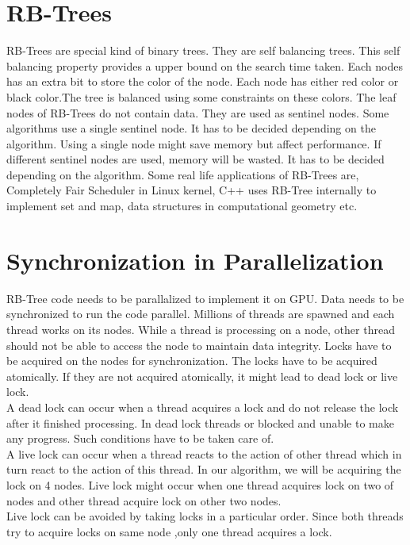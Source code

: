 \documentclass[BTech]{iitmdiss}
\begin{document}
\section{RB-Trees}
RB-Trees are special kind of binary trees. They are self balancing trees. This self balancing property provides a upper bound on the search time taken. Each nodes has an extra bit to store the color of the node. Each node has either red color or black color.The tree is balanced using some constraints on these colors. The leaf nodes of RB-Trees do not contain data. They are used as sentinel nodes. Some algorithms use a single sentinel node. It has to be decided depending on the algorithm. Using a single node might save memory but affect performance. If different sentinel nodes are used, memory will be wasted. It has to be decided depending on the algorithm. Some real life applications of RB-Trees are, Completely Fair Scheduler in Linux kernel, C++ uses RB-Tree internally to implement set and map, data structures in computational geometry etc. \\
\section{Synchronization in Parallelization}
RB-Tree code needs to be parallalized to implement it on GPU. Data needs to be synchronized to run the code parallel. Millions of threads are spawned and each thread works on its nodes. While a thread is processing on a node, other thread should not be able to access the node to maintain data integrity. Locks have to be acquired on the nodes for synchronization. The locks have to be acquired atomically. If they are not acquired atomically, it might lead to dead lock or live lock.\\
A dead lock can occur when a thread acquires a lock and do not release the lock after it finished processing. In dead lock threads or blocked and unable to make any progress. Such conditions have to be taken care of.\\
A live lock can occur when a thread reacts to the action of other thread which in turn react to the action of this thread. In our algorithm, we will be acquiring the lock on 4 nodes. Live lock might occur when one thread acquires lock on two of nodes and other thread acquire lock on other two nodes. \\
Live lock can be avoided by taking locks in a particular order. Since both threads try to acquire locks on same node ,only one thread acquires a lock.\\
\end{document}
